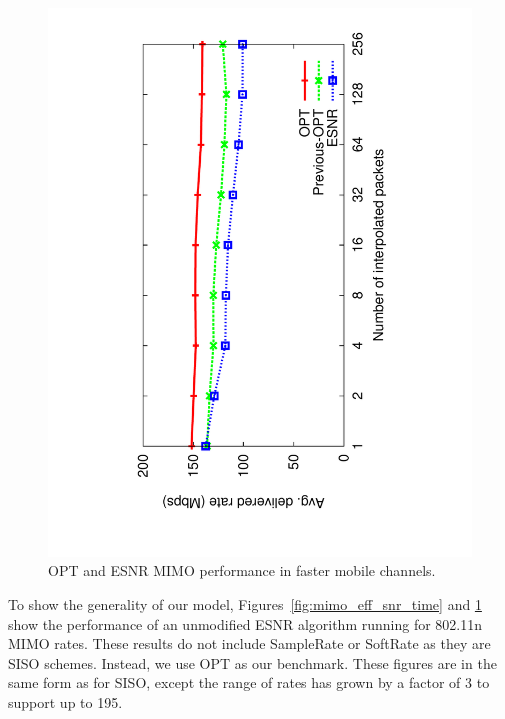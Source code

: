 \begin{figure}[t]
      \centering
      \includegraphics[angle=-90,viewport=125 68 491 760,clip,width=.95\columnwidth]{figures/esnr/mimo_rate_skip.pdf}
      \vspace{-2pt}
      \caption{\label{fig:mimo_eff_snr_speedup} OPT and ESNR MIMO performance in faster mobile channels.}
      \vspace{-2pt}
\end{figure}

To show the generality of our model, Figures~\ref{fig:mimo_eff_snr_time} and \ref{fig:mimo_eff_snr_speedup} show the performance of an unmodified ESNR algorithm running for 802.11n MIMO rates. These results do not include SampleRate or SoftRate as they are SISO schemes. Instead, we use OPT as our benchmark.
These figures are in the same form as for SISO, except the range of rates has grown by a factor of 3 to support up to 195\Mbps. 

